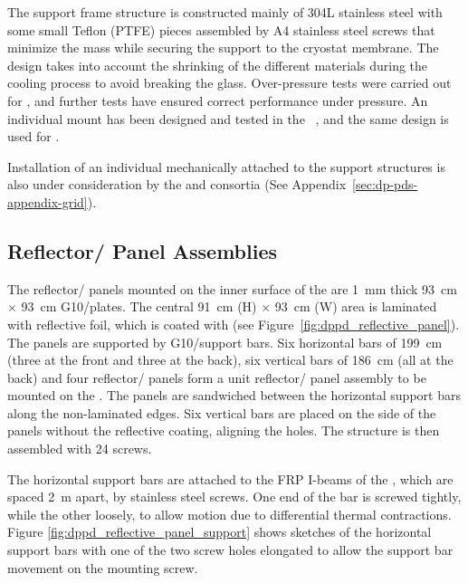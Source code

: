 The support frame structure is constructed mainly of \num{304}L stainless steel with some small Teflon (PTFE) pieces assembled by A4 stainless steel screws that minimize the mass while securing the  support to the cryostat membrane. The design %
takes into account the shrinking of the different materials during the cooling process to avoid breaking the  glass.
Over-pressure tests were carried out for , and further tests have ensured correct performance under pressure. An individual  mount has been designed and tested in the  ~\cite{Zambelli:2017dkg}, and the same design is used for .

Installation of an individual  mechanically attached to the  support structures is also under consideration by the  and   consortia (See Appendix~\ref{sec:dp-pds-appendix-grid}).


\subsection{Reflector/ Panel Assemblies}
\label{subsec:dp-pds-mechanics-reflectors}

The reflector/ panels mounted on the inner surface of the  are \SI{1}{\mm} thick \SI{93}{\cm} $\times$ \SI{93}{\cm} G10/\frfour plates. The central \SI{91}{\cm} (H) $\times$ \SI{93}{\cm} (W) area is laminated with reflective foil, which is coated with  (see Figure~\ref{fig:dppd_reflective_panel}). The panels are supported by G10/\frfour support bars. Six horizontal bars of \SI{199}{\cm} (three at the front and three at the back), six vertical bars of \SI{186}{\cm} (all at the back) and four reflector/ panels form a unit reflector/ panel assembly to be mounted on the . The panels are sandwiched between the horizontal support bars along the non-laminated edges. Six vertical bars are placed on the side of the panels without the reflective coating, aligning the holes. The structure is then  assembled %
with \num{24} screws.

The horizontal support bars are attached to the FRP I-beams of the , which are spaced \SI{2}{\m} apart, by stainless steel screws. One end of the bar is screwed tightly, while the other loosely, to allow motion due to differential thermal contractions. Figure \ref{fig:dppd_reflective_panel_support} shows sketches of the horizontal support bars with one of the two screw holes elongated to allow the support bar movement on the mounting screw.

